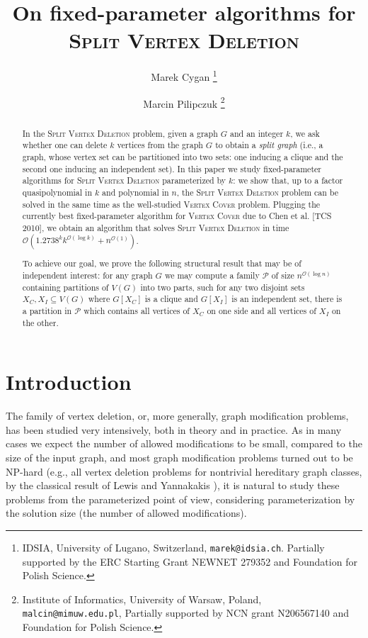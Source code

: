 \documentclass{article}
\newcommand{\Oh}{\ensuremath{\mathcal{O}}}
\newcommand{\splitlong}{\textsc{Split Vertex Deletion}\xspace}
\newcommand{\vertexcover}{\textsc{Vertex Cover}\xspace}
\theoremstyle{definition}
\begin{document}
  \date{}

  \author{
  Marek Cygan
  \thanks{
    IDSIA, University of Lugano, Switzerland, \texttt{marek@idsia.ch}.
    Partially supported by the ERC Starting Grant NEWNET 279352 and Foundation for Polish Science.
  }
  \and
  Marcin Pilipczuk 
  \thanks{
    Institute of Informatics, University of Warsaw, Poland, \texttt{malcin@mimuw.edu.pl},
    Partially supported by NCN grant N206567140 and Foundation for Polish Science.
  }
  }

  \title{On fixed-parameter algorithms for \splitlong}

\maketitle

\begin{abstract}
In the \splitlong problem, given a graph $G$ and an integer $k$,
we ask whether one can delete $k$ vertices from the graph $G$ to obtain
a {\em{split graph}} (i.e., a graph, whose vertex set can be partitioned into two sets:
    one inducing a clique and the second one inducing an independent set).
In this paper we study fixed-parameter algorithms for \splitlong parameterized by $k$:
we show that, up to a factor quasipolynomial in $k$ and polynomial in $n$, the \splitlong
problem can be solved in the same time as the well-studied \vertexcover problem.
Plugging the currently best fixed-parameter algorithm for \vertexcover due to Chen et al. [TCS 2010],
we obtain an algorithm that solves \splitlong in time $\Oh(1.2738^k k^{\Oh(\log k)} + n^{\Oh(1)})$.

To achieve our goal, we prove the following structural result that may be of independent interest:
for any graph $G$ we may compute a family $\mathcal{P}$ of size $n^{\Oh(\log n)}$ 
containing partitions of $V(G)$ into two parts, such
for any two disjoint sets $X_C, X_I \subseteq V(G)$ where $G[X_C]$ is a clique
and $G[X_I]$ is an independent set, there is a partition in $\mathcal{P}$ which contains
all vertices of $X_C$ on one side and all vertices of $X_I$ on the other.
\end{abstract}

\section{Introduction}

The family of vertex deletion, or, more generally,
graph modification problems, has been studied very intensively,
both in theory and in practice.
As in many cases we expect the number of allowed modifications to
be small, compared to the size of the input graph,
   and most graph modification problems
turned out to be NP-hard (e.g., all vertex deletion problems for nontrivial hereditary
graph classes, by the classical
result of Lewis and Yannakakis \cite{lewis-yannakakis}),
it is natural to study these problems from the parameterized point of view, considering
parameterization by the solution size (the number of allowed modifications).
\end{document}
